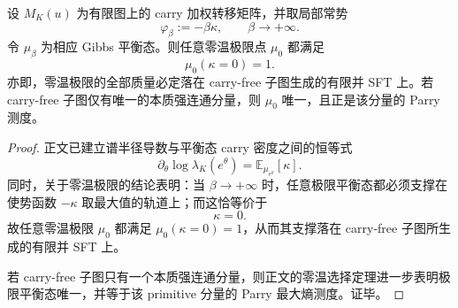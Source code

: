 \begin{theorem}\label{thm:conclusion-carry-zero-temp-support-collapse}
设 \(M_K(u)\) 为有限图上的 carry 加权转移矩阵，并取局部常势
\[
\varphi_\beta:=-\beta\kappa,
\qquad
\beta\to+\infty.
\]
令 \(\mu_\beta\) 为相应 Gibbs 平衡态。则任意零温极限点 \(\mu_0\) 都满足
\[
\boxed{\;\mu_0(\kappa=0)=1.\;}
\]
亦即，零温极限的全部质量必定落在 carry-free 子图生成的有限并 SFT 上。若 carry-free 子图仅有唯一的本质强连通分量，则 \(\mu_0\) 唯一，且正是该分量的 Parry 测度。
\end{theorem}
\begin{proof}
正文已建立谱半径导数与平衡态 carry 密度之间的恒等式
\[
\partial_\theta\log\lambda_K(e^\theta)=\mathbb E_{\mu_{e^\theta}}[\kappa].
\]
同时，关于零温极限的结论表明：当 \(\beta\to+\infty\) 时，任意极限平衡态都必须支撑在使势函数 \(-\kappa\) 取最大值的轨道上；而这恰等价于
\[
\kappa=0.
\]
故任意零温极限 \(\mu_0\) 都满足 \(\mu_0(\kappa=0)=1\)，从而其支撑落在 carry-free 子图所生成的有限并 SFT 上。

若 carry-free 子图只有一个本质强连通分量，则正文的零温选择定理进一步表明极限平衡态唯一，并等于该 primitive 分量的 Parry 最大熵测度。证毕。
\end{proof}
